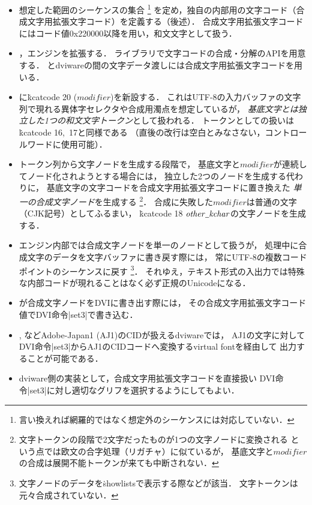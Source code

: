 \documentclass[a4paper,11pt,nomag,dvipdfmx]{jsarticle}
\def\_{\leavevmode\vrule width .45em height -.2ex depth .3ex\relax}
\begin{document}
\begin{itemize}
 \item 想定した範囲のシーケンスの集合%
   \footnote{言い換えれば網羅的ではなく想定外のシーケンスには対応していない．}%
   を定め，\upTeX 独自の内部用の文字コード（合成文字用拡張文字コード）を定義する（後述）．
   合成文字用拡張文字コードにはコード値0x220000以降を用い，和文文字として扱う．
 \item {}，\upTeX エンジンを拡張する．
   ライブラリで文字コードの合成・分解のAPIを用意する．
   \upTeX とdviwareの間の文字データ渡しには合成文字用拡張文字コードを用いる．
 \item \upTeX に\.{kcatcode} 20 ($\mathit{modifier}$)を新設する．
   これはUTF-8の入力バッファの文字列で現れる異体字セレクタや合成用濁点を想定しているが，
   \emph{基底文字とは独立した1つの和文文字トークン}として扱われる．
   トークンとしての扱いは\.{kcatcode} 16,~17と同様である
   （直後の改行は空白とみなさない，コントロールワードに使用可能）．
 \item トークン列から文字ノードを生成する段階で，
   基底文字と$\mathit{modifier}$が連続してノード化されようとする場合には，
   独立した2つのノードを生成する代わりに，
   基底文字の文字コードを合成文字用拡張文字コードに置き換えた
   \emph{単一の合成文字ノード}を生成する
   \footnote{文字トークンの段階で2文字だったものが1つの文字ノードに変換される
     という点では欧文の合字処理（リガチャ）に似ているが，
     基底文字と$\mathit{modifier}$の合成は展開不能トークンが来ても中断されない．}．
   合成に失敗した$\mathit{modifier}$は普通の文字（CJK記号）としてふるまい，
   \.{kcatcode} 18 $\mathit{other\_kchar}$の文字ノードを生成する．
 \item \upTeX エンジン内部では合成文字ノードを単一のノードとして扱うが，
   処理中に合成文字のデータを文字バッファに書き戻す際には，
   常にUTF-8の複数コードポイントのシーケンスに戻す
   \footnote{文字ノードのデータを\.{showlists}で表示する際などが該当．
     文字トークンは元々合成されていない．}．
   それゆえ，テキスト形式の入出力では特殊な内部コードが現れることはなく必ず正規のUnicodeになる．
 \item \upTeX が合成文字ノードをDVIに書き出す際には，
   その合成文字用拡張文字コード値でDVI命令|set3|で書き込む．
 \item {}, などAdobe-Japan1 (AJ1)のCIDが扱えるdviwareでは，
   AJ1の文字に対してDVI命令|set3|からAJ1のCIDコードへ変換するvirtual fontを経由して
   出力することが可能である．
 \item dviware側の実装として，合成文字用拡張文字コードを直接扱い
   DVI命令|set3|に対し適切なグリフを選択するようにしてもよい．
\end{itemize}
\end{document}
